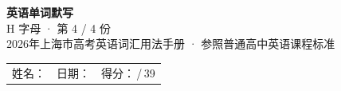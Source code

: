 \documentclass[10pt,a4paper]{article}
\begin{document}
\pagestyle{plain}

\begin{center}
{\LARGE\bfseries 英语单词默写}\\[0.22em]
{\large H 字母 · 第 4 / 4 份}\\[0.18em]
{\small 2026年上海市高考英语词汇用法手册 · 参照普通高中英语课程标准}
\end{center}

\vspace{0.25em}
\noindent\begin{tabular}{@{}p{}@{}p{}@{}p{}@{}}
姓名：\underline{\hspace{2.0cm}} & 日期：\underline{\hspace{2.0cm}} & 得分：\underline{\hspace{1.3cm}}\,/\,39 \\
\end{tabular}

\vspace{0.3em}

\vspace{0.08em}
\end{document}
